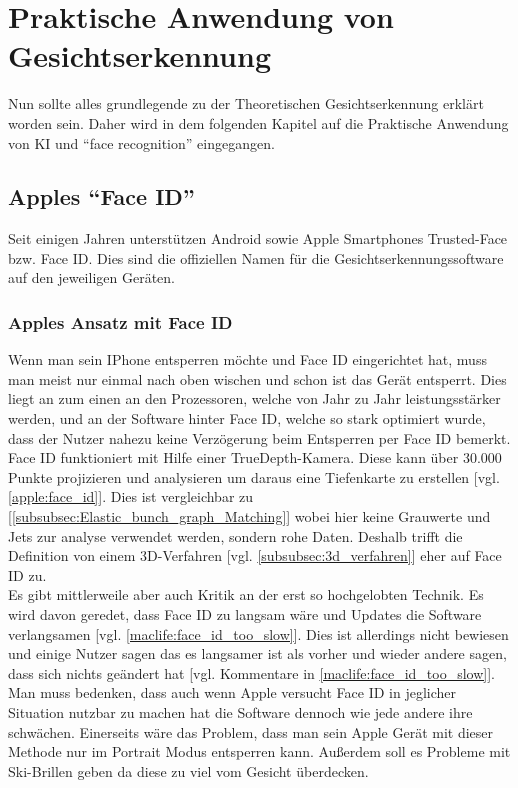 \section{Praktische Anwendung von Gesichtserkennung}
\label{sec:Praltische_Anwendung_Kuenslicher_Intelligenz}

    Nun sollte alles grundlegende zu der Theoretischen Gesichtserkennung erklärt worden sein. Daher wird in dem folgenden Kapitel auf die Praktische Anwendung von KI und \enquote{face recognition} eingegangen.

    \subsection{Apples \enquote{Face ID}}
    \label{subsec:FaceID_TrustedFace}
        Seit einigen Jahren unterstützen Android sowie Apple Smartphones Trusted-Face bzw. Face ID. Dies sind die offiziellen Namen für die Gesichtserkennungssoftware auf den jeweiligen Geräten.

        \subsubsection{Apples Ansatz mit Face ID}
            Wenn man sein IPhone entsperren möchte und Face ID eingerichtet hat, muss man meist nur einmal nach oben wischen und schon ist das Gerät entsperrt. Dies liegt an zum einen an den Prozessoren, welche von Jahr zu Jahr leistungsstärker werden, und an der Software hinter Face ID, welche so stark optimiert wurde, dass der Nutzer nahezu keine Verzögerung beim Entsperren per Face ID bemerkt.\\
            Face ID funktioniert mit Hilfe einer TrueDepth-Kamera. Diese kann über 30.000 Punkte projizieren und analysieren um daraus eine Tiefenkarte zu erstellen [vgl. \ref{apple:face_id}]. Dies ist vergleichbar zu [\ref{subsubsec:Elastic_bunch_graph_Matching}] wobei hier keine Grauwerte und Jets zur analyse verwendet werden, sondern rohe Daten. Deshalb trifft die Definition von einem 3D-Verfahren [vgl. \ref{subsubsec:3d_verfahren}] eher auf Face ID zu.\\
            Es gibt mittlerweile aber auch Kritik an der erst so hochgelobten Technik. Es wird davon geredet, dass Face ID zu langsam wäre und Updates die Software verlangsamen [vgl. \ref{maclife:face_id_too_slow}]. Dies ist allerdings nicht bewiesen und einige Nutzer sagen das es langsamer ist als vorher und wieder andere sagen, dass sich nichts geändert hat [vgl. Kommentare in \ref{maclife:face_id_too_slow}]. Man muss bedenken, dass auch wenn Apple versucht Face ID in jeglicher Situation nutzbar zu machen hat die Software dennoch wie jede andere ihre schwächen. Einerseits wäre das Problem, dass man sein Apple Gerät mit dieser Methode nur im Portrait Modus entsperren kann. Außerdem soll es Probleme mit Ski-Brillen geben da diese zu viel vom Gesicht überdecken.

